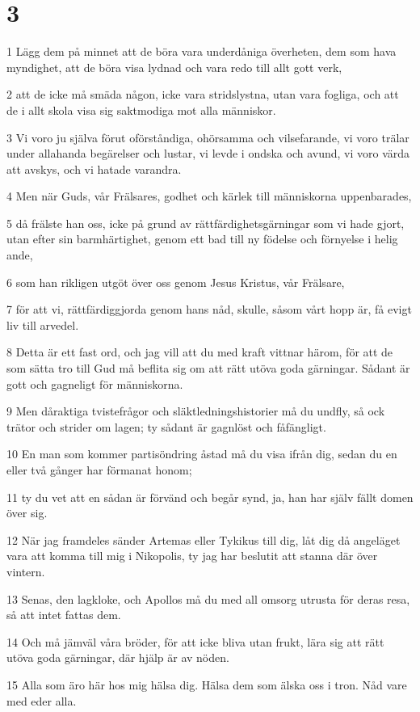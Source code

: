 \chapter{3}

\par 1 Lägg dem på minnet att de böra vara underdåniga överheten, dem som hava myndighet, att de böra visa lydnad och vara redo till allt gott verk,
\par 2 att de icke må smäda någon, icke vara stridslystna, utan vara fogliga, och att de i allt skola visa sig saktmodiga mot alla människor.
\par 3 Vi voro ju själva förut oförståndiga, ohörsamma och vilsefarande, vi voro trälar under allahanda begärelser och lustar, vi levde i ondska och avund, vi voro värda att avskys, och vi hatade varandra.
\par 4 Men när Guds, vår Frälsares, godhet och kärlek till människorna uppenbarades,
\par 5 då frälste han oss, icke på grund av rättfärdighetsgärningar som vi hade gjort, utan efter sin barmhärtighet, genom ett bad till ny födelse och förnyelse i helig ande,
\par 6 som han rikligen utgöt över oss genom Jesus Kristus, vår Frälsare,
\par 7 för att vi, rättfärdiggjorda genom hans nåd, skulle, såsom vårt hopp är, få evigt liv till arvedel.
\par 8 Detta är ett fast ord, och jag vill att du med kraft vittnar härom, för att de som sätta tro till Gud må beflita sig om att rätt utöva goda gärningar. Sådant är gott och gagneligt för människorna.
\par 9 Men dåraktiga tvistefrågor och släktledningshistorier må du undfly, så ock trätor och strider om lagen; ty sådant är gagnlöst och fåfängligt.
\par 10 En man som kommer partisöndring åstad må du visa ifrån dig, sedan du en eller två gånger har förmanat honom;
\par 11 ty du vet att en sådan är förvänd och begår synd, ja, han har själv fällt domen över sig.
\par 12 När jag framdeles sänder Artemas eller Tykikus till dig, låt dig då angeläget vara att komma till mig i Nikopolis, ty jag har beslutit att stanna där över vintern.
\par 13 Senas, den lagkloke, och Apollos må du med all omsorg utrusta för deras resa, så att intet fattas dem.
\par 14 Och må jämväl våra bröder, för att icke bliva utan frukt, lära sig att rätt utöva goda gärningar, där hjälp är av nöden.
\par 15 Alla som äro här hos mig hälsa dig. Hälsa dem som älska oss i tron. Nåd vare med eder alla.


